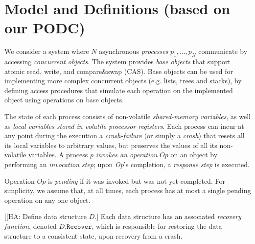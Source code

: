 \section{Model and Definitions (based on our PODC)}
\label{section: Model}


We consider a system where $N$ asynchronous \textit{processes}
$p_1, \ldots, p_{N}$ communicate by accessing \emph{concurrent objects}.
The system provides \textit{base objects} that support
atomic read, write, and compare\&swap (CAS).
Base objects can be used for implementing more complex concurrent
objects (e.g. lists, trees and stacks), by defining access procedures
that simulate each operation on the implemented object using operations
on base objects.

The state of each process consists of non-volatile \emph{shared-memory variables},
as well as \emph{local variables stored in volatile processor registers}.
Each process can incur at any point during the execution a \emph{crash-failure}
(or simply a \emph{crash}) that resets all its local variables to arbitrary values,
but preserves the values of all its non-volatile variables.
A process $p$ \emph{invokes an operation} $Op$ on an object by performing
an \emph{invocation step}; 
upon \emph{Op}'s completion, a \emph{response step} is executed.

Operation $Op$ is \emph{pending} if it was invoked but was not yet completed.
For simplicity, we assume that, at all times,
each process has at most a single pending operation on any one object.

[[HA: Define data structure $D$.]
Each data structure has an associated \emph{recovery function},
denoted $D.\texttt{Recover}$,
which is responsible for restoring the data structure to a consistent 
state, upon recovery from a crash.

